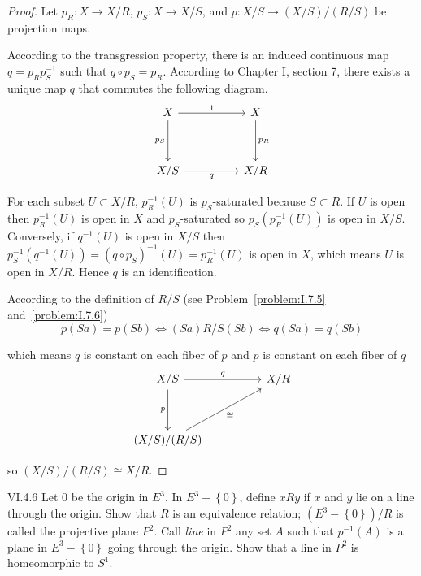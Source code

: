 \begin{proof}
	Let \( p_{R}: X \to X/R \), \( p_{S}: X \to X/S \), and \( p: X/S \to (X/S)/(R/S) \) be projection maps.

	According to the transgression property, there is an induced continuous map \( q = p_{R}p_{S}^{-1} \) such that \( q \circ p_{S} = p_{R} \). According to Chapter I, section 7, there exists a unique map \( q \) that commutes the following diagram.
	\[
		\begin{tikzcd}
			X && X \\
			\\
			{X/S} && {X/R}
			\arrow["1", from=1-1, to=1-3]
			\arrow["{p_{S}}"', from=1-1, to=3-1]
			\arrow["{p_{R}}", from=1-3, to=3-3]
			\arrow["q"', from=3-1, to=3-3]
		\end{tikzcd}
	\]

	For each subset \( U \subset X/R \), \( p_{R}^{-1}(U) \) is \( p_{S} \)-saturated because \( S \subset R \). If \( U \) is open then \( p_{R}^{-1}(U) \) is open in \( X \) and \( p_{S} \)-saturated so \( p_{S}(p_{R}^{-1}(U)) \) is open in \( X/S \). Conversely, if \( q^{-1}(U) \) is open in \( X/S \) then \( p_{S}^{-1}(q^{-1}(U)) = {(q \circ p_{S})}^{-1}(U) = p_{R}^{-1}(U) \) is open in \( X \), which means \( U \) is open in \( X/R \). Hence \( q \) is an identification.

	According to the definition of \( R/S \) (see Problem~\ref{problem:I.7.5} and~\ref{problem:I.7.6})
	\[
		p(Sa) = p(Sb) \iff (Sa)R/S(Sb) \iff q(Sa) = q(Sb)
	\]

	which means \( q \) is constant on each fiber of \( p \) and \( p \) is constant on each fiber of \( q \)
	\[
		\begin{tikzcd}
			{X/S} && {X/R} \\
			\\
			{(X/S)/(R/S)}
			\arrow["q", from=1-1, to=1-3]
			\arrow["p"', from=1-1, to=3-1]
			\arrow["\cong"', from=3-1, to=1-3]
		\end{tikzcd}
	\]

	so \( (X/S)/(R/S) \cong X/R \).
\end{proof}

\begin{problem}{VI.4.6}
Let \( 0 \) be the origin in \( E^{3} \). In \( E^{3} - \left\{ 0 \right\} \), define \( x R y \) if \( x \) and \( y \) lie on a line through the origin. Show that \( R \) is an equivalence relation; \( (E^{3} - \left\{ 0 \right\})/R \) is called the projective plane \( P^{2} \). Call \textit{line} in \( P^{2} \) any set \( A \) such that \( p^{-1}(A) \) is a plane in \( E^{3} - \left\{ 0 \right\} \) going through the origin. Show that a line in \( P^{2} \) is homeomorphic to \( S^{1} \).
\end{problem}

